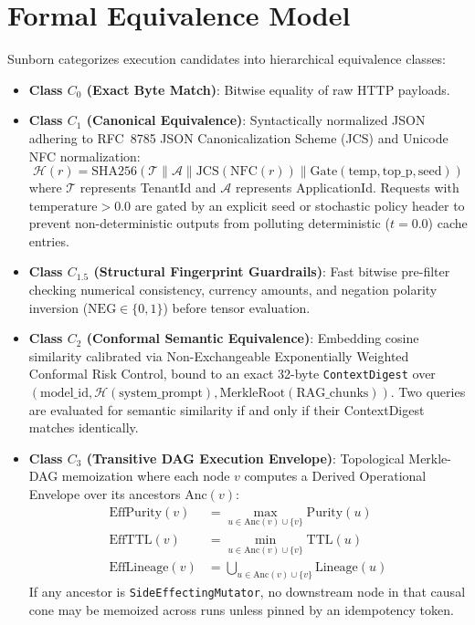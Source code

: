 \documentclass[conference]{IEEEtran}
\begin{document}
\section{Formal Equivalence Model}
Sunborn categorizes execution candidates into hierarchical equivalence classes:
\begin{itemize}
    \item \textbf{Class $C_0$ (Exact Byte Match)}: Bitwise equality of raw HTTP payloads.
    \item \textbf{Class $C_1$ (Canonical Equivalence)}: Syntactically normalized JSON adhering to RFC~8785 JSON Canonicalization Scheme (JCS) and Unicode NFC normalization:
    \begin{equation}
        \mathcal{H}(r) = \text{SHA256}(\mathcal{T} \parallel \mathcal{A} \parallel \text{JCS}(\text{NFC}(r)) \parallel \text{Gate}(\text{temp}, \text{top\_p}, \text{seed}))
    \end{equation}
    where $\mathcal{T}$ represents TenantId and $\mathcal{A}$ represents ApplicationId. Requests with $\text{temperature} > 0.0$ are gated by an explicit seed or stochastic policy header to prevent non-deterministic outputs from polluting deterministic ($t=0.0$) cache entries.
    \item \textbf{Class $C_{1.5}$ (Structural Fingerprint Guardrails)}: Fast bitwise pre-filter checking numerical consistency, currency amounts, and negation polarity inversion ($\text{NEG} \in \{0, 1\}$) before tensor evaluation.
    \item \textbf{Class $C_2$ (Conformal Semantic Equivalence)}: Embedding cosine similarity calibrated via Non-Exchangeable Exponentially Weighted Conformal Risk Control, bound to an exact 32-byte \texttt{ContextDigest} over $(\text{model\_id}, \mathcal{H}(\text{system\_prompt}), \text{MerkleRoot}(\text{RAG\_chunks}))$. Two queries are evaluated for semantic similarity if and only if their ContextDigest matches identically.
    \item \textbf{Class $C_3$ (Transitive DAG Execution Envelope)}: Topological Merkle-DAG memoization where each node $v$ computes a Derived Operational Envelope over its ancestors $\text{Anc}(v)$:
    \begin{align}
        \text{EffPurity}(v) &= \max_{u \in \text{Anc}(v) \cup \{v\}} \text{Purity}(u) \\
        \text{EffTTL}(v) &= \min_{u \in \text{Anc}(v) \cup \{v\}} \text{TTL}(u) \\
        \text{EffLineage}(v) &= \bigcup_{u \in \text{Anc}(v) \cup \{v\}} \text{Lineage}(u)
    \end{align}
    If any ancestor is \texttt{SideEffectingMutator}, no downstream node in that causal cone may be memoized across runs unless pinned by an idempotency token.
\end{itemize}
\end{document}
